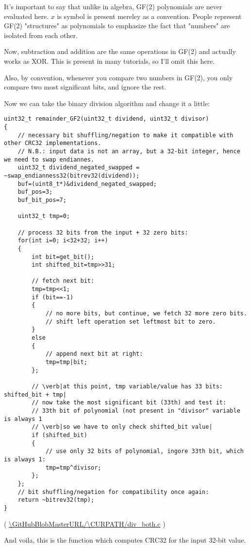 It's important to say that unlike in algebra, GF(2) polynomials are never evaluated here.
$x$ is symbol is present mereley as a convention.
People represent GF(2) "structures" as polynomials to emphasize the fact that "numbers" are isolated from each other.

Now, subtraction and addition are the same operations in GF(2) and actually works as XOR.
This is present in many tutorials, so I'll omit this here.

Also, by convention, whenever you compare two numbers in GF(2), you only compare two most significant bits,
and ignore the rest.


Now we can take the binary division algorithm and change it a little:

\begin{lstlisting}[style=customc]
uint32_t remainder_GF2(uint32_t dividend, uint32_t divisor)
{
	// necessary bit shuffling/negation to make it compatible with other CRC32 implementations.
	// N.B.: input data is not an array, but a 32-bit integer, hence we need to swap endiannes.
	uint32_t dividend_negated_swapped = ~swap_endianness32(bitrev32(dividend));
	buf=(uint8_t*)&dividend_negated_swapped;
	buf_pos=3;
	buf_bit_pos=7;

	uint32_t tmp=0;

	// process 32 bits from the input + 32 zero bits:
	for(int i=0; i<32+32; i++)
	{
		int bit=get_bit();
		int shifted_bit=tmp>>31;

		// fetch next bit:
		tmp=tmp<<1;
		if (bit==-1)
		{
			// no more bits, but continue, we fetch 32 more zero bits.
			// shift left operation set leftmost bit to zero.
		}
		else
		{
			// append next bit at right:
			tmp=tmp|bit;
		};

		// \verb|at this point, tmp variable/value has 33 bits: shifted_bit + tmp|
		// now take the most significant bit (33th) and test it:
		// 33th bit of polynomial (not present in "divisor" variable is always 1
		// \verb|so we have to only check shifted_bit value|
		if (shifted_bit)
		{
			// use only 32 bits of polynomial, ingore 33th bit, which is always 1:
			tmp=tmp^divisor;
		};
	};
	// bit shuffling/negation for compatibility once again:
	return ~bitrev32(tmp);
}
\end{lstlisting}

( \url{\GitHubBlobMasterURL/\CURPATH/div_both.c} )

And voila, this is the function which computes CRC32 for the input 32-bit value.

